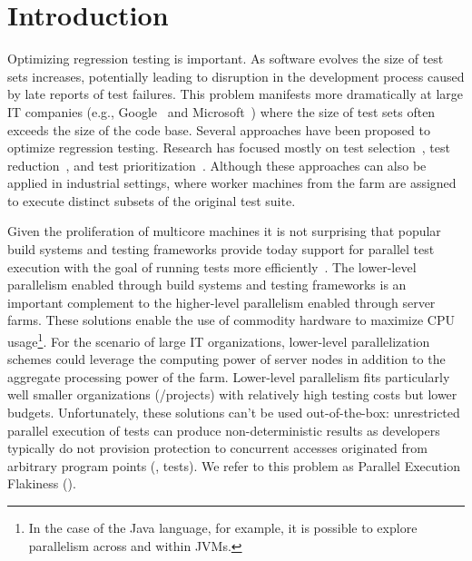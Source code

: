 \section{Introduction}

Optimizing regression testing is important.  As software evolves the
size of test sets increases, potentially leading to disruption in the
development process caused by late reports of test failures.  This
problem manifests more dramatically at large IT companies
(e.g., Google~ and
Microsoft~) where the size of test sets often exceeds the
size of the code base.  Several approaches have been proposed to
optimize regression testing.  Research has focused mostly on test
selection~, test reduction~, and test
prioritization~.  Although these approaches can also be
applied in industrial settings,  where worker machines
from the farm are assigned to execute distinct subsets of the original
test suite.

Given the proliferation of multicore machines it is not surprising
that popular build systems and testing frameworks provide today
support for parallel test execution with the goal of running tests
more efficiently~\cite{junit-org,testng,nunit,maven-surefire-plugin}.
The lower-level parallelism enabled through build systems and testing
frameworks is an important complement to the higher-level parallelism
enabled through server farms.  These solutions enable the use of
commodity hardware to maximize CPU usage\footnote{In the case of the
  Java language, for example, it is possible to explore parallelism
  across and within JVMs.}.  For the scenario of large IT
organizations, lower-level parallelization schemes could leverage the
computing power of server nodes in addition to the aggregate
processing power of the farm.  Lower-level parallelism fits
particularly well smaller organizations (/projects) with relatively
high testing costs but lower budgets.  Unfortunately, these solutions
can't be used out-of-the-box: unrestricted parallel execution of tests
can produce non-deterministic results as developers typically do not
provision protection to concurrent accesses originated from arbitrary
program points (\ie{}, tests).  We refer to this problem as Parallel
Execution Flakiness (\pef{}).

